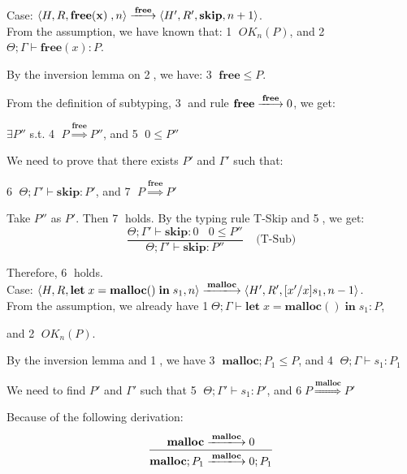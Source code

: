 \documentclass[english]{jssst_ppl} %
\newcommand\LET{\mathbf{let}\;}
\newcommand\FREE{\mathbf{free(x)}\;}
\newcommand\IN{\mathbf{in}\;}
\newcommand\SKIP{\mathbf{skip}}
\newcommand\Rtab{\; \; \; \;}
\newcommand\MALLOC{\mathbf{malloc()}\;}
\newcommand\Malloc{\mathbf{malloc}}
\newcommand\Free{\mathbf{free}}
\newcommand\Cirx{(x)}
\theoremstyle{definition}
\begin{document}
\noindent Case: $\langle H, R, \FREE, n \rangle \xlongrightarrow{\Free} \langle H', R', \SKIP, n + 1 \rangle $. \\

From the assumption, we have known that: \textcircled{1} $OK_{n}(P)$, and \textcircled{2} $\Theta; \Gamma \vdash \Free\Cirx:P$.

By the inversion lemma on \textcircled{2}, we have: \textcircled{3} $\Free \le P$.

From the definition of subtyping, \textcircled{3} and rule $\Free \xlongrightarrow{\Free} 0$, we get:
\begin{center}
$\exists P''$ s.t. \textcircled{4} $P \overset{\text{$\Free$}}{\Longrightarrow} P''$,  and \textcircled{5} $0 \le P''$
\end{center}

We need to prove that there exists $P'$ and $\Gamma'$ such that:
\begin{center}
\textcircled{6} $\Theta; \Gamma' \vdash \SKIP: P'$,  and \textcircled{7} $P \overset{\text{$\Free$}}{\Longrightarrow} P'$
\end{center}

Take $P''$ as $P'$. Then \textcircled{7} holds. By the typing rule T-Skip and \textcircled{5}, we get:
$$
   \frac{\Theta; \Gamma' \vdash \SKIP : 0 \ \ \ \  0 \le P''}
   {\Theta; \Gamma' \vdash \SKIP : P''}
   \Rtab \mbox{(T-Sub)}
$$

Therefore, \textcircled{6} holds. \\

\noindent Case: $\langle H, R, \LET x = \MALLOC \IN s_{1}, n \rangle \xlongrightarrow{\Malloc} \langle H', R', [x'/x]s_{1}, n - 1  \rangle $.\\

From the assumption, we already have \textcircled{1}$\Theta; \Gamma \vdash \LET x = \MALLOC \IN s_{1} : P$,

and \textcircled{2} $OK_{n}(P)$.

By the inversion lemma and \textcircled{1}, we have \textcircled{3} $\Malloc;P_{1} \le P$, and \textcircled{4} $\Theta; \Gamma \vdash s_{1} : P_{1}$

We need to find $P'$ and $\Gamma'$ such that \textcircled{5} $\Theta; \Gamma' \vdash s_{1} : P'$, and \textcircled{6}$P \overset{\text{$\Malloc$}}{\Longrightarrow} P'$

Because of the following derivation:
$$
  \frac{ \Malloc \xlongrightarrow{\Malloc} 0}
  {\Malloc;P_{1} \xlongrightarrow{\Malloc} 0;P_{1}}
$$
\end{document}
